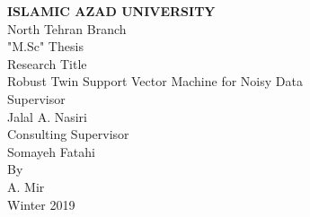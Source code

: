 
\thispagestyle{empty}

\begin{center}
	
	\begin{latin}
		
		{\LARGE \bf ISLAMIC AZAD UNIVERSITY}
		\\[1cm]
		{\Large North Tehran Branch}
		\\[1cm]
		{\Large "M.Sc" Thesis}
		\\[2cm]
		
		{\Large Research Title}
		\\[.5cm]
		{ Robust Twin Support Vector Machine for Noisy Data}
		\\[1cm]
		{\Large Supervisor}
		\\[.5cm]
		{Jalal A. Nasiri}
		\\[1cm]
		{\Large Consulting Supervisor}
		\\[.5cm]
		{Somayeh Fatahi}
		\\[1cm]
		{\Large By}
		\\[.5cm]
		{A. Mir}
		\\[1cm]
		Winter 2019
		
	\end{latin}
\end{center}
